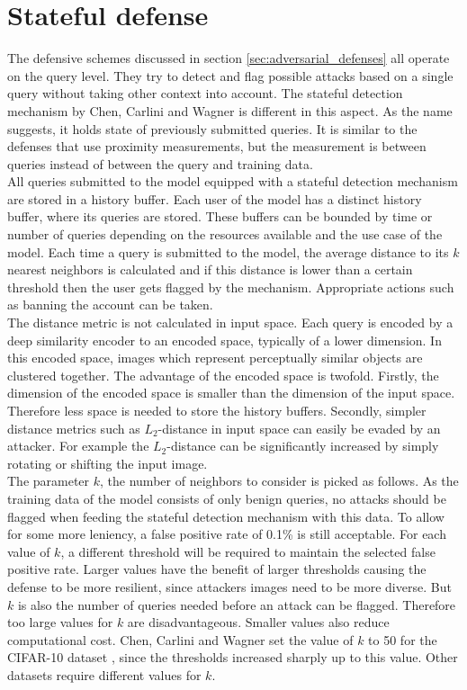 \section{Stateful defense}\label{sec:stateful_detection}
The defensive schemes discussed in section \ref{sec:adversarial_defenses} all operate on the query level. They try to detect and flag possible attacks based on a single query without taking other context into account. The stateful detection mechanism by Chen, Carlini and Wagner \cite{chen_stateful_2019} is different in this aspect. As the name suggests, it holds state of previously submitted queries. It is similar to the defenses that use proximity measurements, but the measurement is between queries instead of between the query and training data.\\

All queries submitted to the model equipped with a stateful detection mechanism are stored in a history buffer. Each user of the model has a distinct history buffer, where its queries are stored. These buffers can be bounded by time or number of queries depending on the resources available and the use case of the model. Each time a query is submitted to the model, the average distance to its $k$ nearest neighbors is calculated and if this distance is lower than a certain threshold then the user gets flagged by the mechanism. Appropriate actions such as banning the account can be taken.\\

The distance metric is not calculated in input space. Each query is encoded by a deep similarity encoder \cite{deep_similarity_encoder} to an encoded space, typically of a lower dimension. In this encoded space, images which represent perceptually similar objects are clustered together. The advantage of the encoded space is twofold. Firstly, the dimension of the encoded space is smaller than the dimension of the input space. Therefore less space is needed to store the history buffers. Secondly, simpler distance metrics such as $L_2$-distance in input space can easily be evaded by an attacker. For example the $L_2$-distance can be significantly increased by simply rotating or shifting the input image.\\

The parameter $k$, the number of neighbors to consider is picked as follows. As the training data of the model consists of only benign queries, no attacks should be flagged when feeding the stateful detection mechanism with this data. To allow for some more leniency, a false positive rate of 0.1\% is still acceptable. For each value of $k$, a different threshold will be required to maintain the selected false positive rate. Larger values have the benefit of larger thresholds causing the defense to be more resilient, since attackers images need to be more diverse. But $k$ is also the number of queries needed before an attack can be flagged. Therefore too large values for $k$ are disadvantageous. Smaller values also reduce computational cost. Chen, Carlini and Wagner set the value of $k$ to 50 for the CIFAR-10  dataset \cite{cifar}, since the thresholds increased sharply up to this value. Other datasets require different values for $k$.

